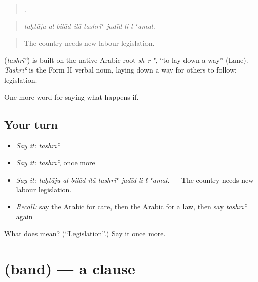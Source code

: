 \begin{quote}
     .
\end{quote}

\begin{quote}
\emph{taḥtāju al-bilād ilā tashrīʿ jadīd li-l-ʿamal.}
\end{quote}

\begin{quote}
The country needs new labour legislation.
\end{quote}

\begin{cousinweb}
\textbf{} (\emph{tashrīʿ}) is built on the native Arabic root \emph{sh-r-ʿ}, \textquotedblleft{}to lay down a way\textquotedblright{} (Lane). \emph{Tashrīʿ} is the Form II verbal noun, laying down a way for others to follow: legislation.
\end{cousinweb}

\begin{grammarlens}[title={What you've built}]
One more word for saying what happens if.
\end{grammarlens}

\subsection*{Your turn}
\begin{itemize}
\raggedright
  \item \emph{Say it:} \emph{tashrīʿ}
  \item \emph{Say it:} \emph{tashrīʿ}, once more
  \item \emph{Say it:} \emph{taḥtāju al-bilād ilā tashrīʿ jadīd li-l-ʿamal.} — The country needs new labour legislation.
  \item \emph{Recall:} say the Arabic for care, then the Arabic for a law, then say \emph{tashrīʿ} again
\end{itemize}

\begin{tcolorbox}[breakable,colback=teal!4,colframe=teal!35!black,title={Before you move on}]
What does  mean? (\textquotedblleft{}Legislation\textquotedblright{}.) Say it once more.
\end{tcolorbox}
\section[\texorpdfstring{\ar{بند} (band)}{بند (band)}]{ (band) — a clause}

